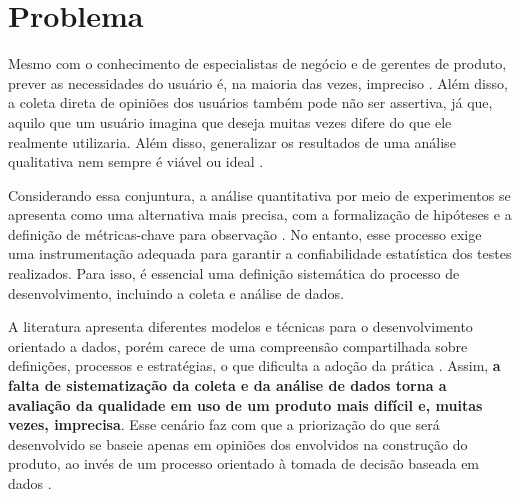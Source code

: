 \section{Problema}

Mesmo com o conhecimento de especialistas de negócio e de gerentes de produto, prever as necessidades do usuário é, na maioria das vezes, impreciso \cite{castellion2008do}. Além disso, a coleta direta de opiniões dos usuários também pode não ser assertiva, já que, aquilo que um usuário imagina que deseja muitas vezes difere do que ele realmente utilizaria. Além disso, generalizar os resultados de uma análise qualitativa nem sempre é viável ou ideal \cite{cao2008agile}.

Considerando essa conjuntura, a análise quantitativa por meio de experimentos se apresenta como uma alternativa mais precisa, com a formalização de hipóteses e a definição de métricas-chave para observação \cite{kohavi_oce_and_ab_tests_2017}. No entanto, esse processo exige uma instrumentação adequada para garantir a confiabilidade estatística dos testes realizados. Para isso, é essencial uma definição sistemática do processo de desenvolvimento, incluindo a coleta e análise de dados.

A literatura apresenta diferentes modelos e técnicas para o desenvolvimento orientado a dados, porém carece de uma compreensão compartilhada sobre definições, processos e estratégias, o que dificulta a adoção da prática \cite{quin_b_2024}. Assim, \textbf{a falta de sistematização da coleta e da análise de dados torna a avaliação da qualidade em uso de um produto mais difícil e, muitas vezes, imprecisa}. Esse cenário faz com que a priorização do que será desenvolvido se baseie apenas em opiniões dos envolvidos na construção do produto, ao invés de um processo orientado à tomada de decisão baseada em dados \cite{olsson_opinions_2014}.
